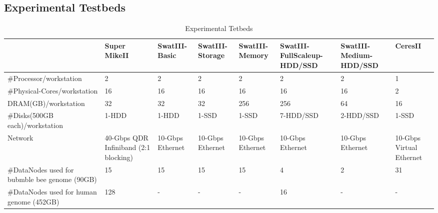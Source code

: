 \documentclass[conference]{IEEEtran}
\begin{document}
\subsection {Experimental Testbeds}
\begin{table}
\begin{center}
    \begin{tabular}{ |p{3.2cm} | p{1.6cm} | p{1.6cm} | p{1.6cm} | p{1.6cm} | p{1.6cm} | p{1.6cm}| p{1.6cm}|} \hline
    & Super MikeII & SwatIII-Basic & SwatIII-Storage & SwatIII-Memory & SwatIII-FullScaleup-HDD/SSD & SwatIII-Medium-HDD/SSD & CeresII \\ \hline
    \#Processor/workstation & 2 & 2 & 2 & 2 & 2 & 2 & 1 \\ \hline
    \#Physical-Cores/workstation & 16 & 16 & 16 & 16 & 16 & 16 & 2 \\ \hline %
    DRAM(GB)/workstation & 32 & 32 & 32 & 256 & 256 & 64 & 16  \\ \hline
    \#Disks(500GB each)/workstation & 1-HDD & 1-HDD & 1-SSD & 1-SSD & 7-HDD/SSD & 2-HDD/SSD & 1-SSD \\ \hline
    Network & 40-Gbps QDR Infiniband (2:1 blocking) & 10-Gbps Ethernet & 10-Gbps Ethernet & 10-Gbps Ethernet & 10-Gbps Ethernet & 10-Gbps Ethernet & 10-Gbps Virtual Ethernet\\ \hline %
    \#DataNodes used for bubmble bee genome (90GB) & 15 & 15 & 15 & 15 & 4 & 2 & 31 \\ \hline
    \#DataNodes used for human genome (452GB)& 128 & - & - & - & 16 & - & - \\ \hline
    \end{tabular}
    \caption{Experimental Tetbeds}
	\label{table:Experimentaltestbeds}
\end{center}
\end{table}
\end{document}
